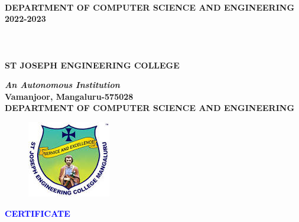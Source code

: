 \documentclass[12pt, letter paper]{report}
\begin{document}
\vspace{0.5cm}
\begin{center}
\large\textbf{\\ DEPARTMENT OF COMPUTER SCIENCE AND ENGINEERING\\ 2022-2023}

\end{center}
\vspace{2cm}
\thispagestyle{empty}
\section*{}
\begin{center}
\Large\textbf{\\ ST JOSEPH ENGINEERING COLLEGE}\\
\end{center}
\begin{center}
\textbf{\textit{An Autonomous Institution}}\\

\large \textbf{Vamanjoor, Mangaluru-575028}\\
\large \textbf{ DEPARTMENT OF COMPUTER SCIENCE AND ENGINEERING} 
\end{center}
\vspace{0.1cm}
\begin{center}
\begin{figure}[h]
 \centering
 \includegraphics[scale=0.7]{sjec.jpeg}
 \label{sjeclogo}
\end{figure}
\end{center}
\vspace{-1cm}
\begin{center}
\large\textbf{\textcolor{blue}{CERTIFICATE}}
\end{center}
\begin{center}
\end{center}
\begin{center}
\end{center}
\begin{center}
\end{center}
\begin{center}
\end{center}
\end{document}
